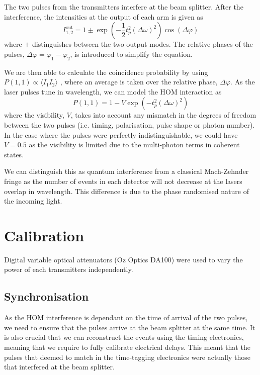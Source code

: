 The two pulses from the transmitters interfere at the beam splitter. After the interference, the intensities at the output of each arm is given as
\begin{equation}
	I^\text{out}_{1,2} = 1 \pm \exp{\left(-\frac{1}{2}t_p^2(\Delta\omega)^2\right)}\cos(\Delta\varphi)
\end{equation}
where $\pm$ distinguishes between the two output modes. The relative phases of the pulses, $\Delta\varphi = \varphi_1 - \varphi_2$, is introduced to simplify the equation.

We are then able to calculate the coincidence probability by using $P(1,1) \propto \langle I_1 I_2\rangle$ \cite{Rarity2005}, where an average is taken over the relative phase, $\Delta\varphi$. As the laser pulses tune in wavelength, we can model the \ac{HOM} interaction as 
\begin{equation}
	P(1,1) = 1 - V \exp{\left(-t_p^2(\Delta\omega)^2\right)}
	\label{eq:gaussian}
\end{equation}
where the visibility, $V$, takes into account any mismatch in the degrees of freedom between the two pulses (i.e. timing, polarisation, pulse shape or photon number). In the case where the pulses were perfectly indistinguishable, we could have $V = 0.5$ as the visibility is limited due to the multi-photon terms in coherent states.

We can distinguish this as quantum interference from a classical Mach-Zehnder fringe as the number of events in each detector will not decrease at the lasers overlap in wavelength. This difference is due to the phase randomised nature of the incoming light.

\section{Calibration}

Digital variable optical attenuators (Oz Optics DA100) were used to vary the power of each transmitters independently. 

\subsection{Synchronisation}

As the \ac{HOM} interference is dependant on the time of arrival of the two pulses, we need to ensure that the pulses arrive at the beam splitter at the same time. It is also crucial that we can reconstruct the events using the timing electronics, meaning that we require to fully calibrate electrical delays. This meant that the pulses that deemed to match in the time-tagging electronics were actually those that interfered at the beam splitter. 

